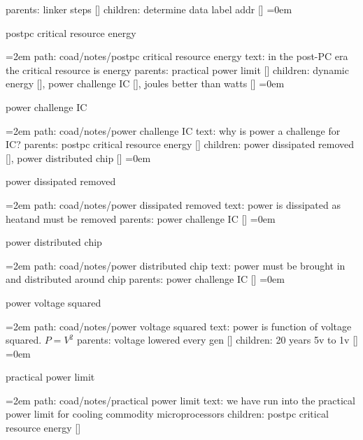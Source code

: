 \smallskip
parents:  linker steps []
\smallskip
children: determine data label addr []
\smallskip
\leftskip=0em
\par\endgroup
\bigskip
{}
postpc critical resource energy
\smallskip
\par\begingroup
\leftskip=2em
path: coad/notes/postpc critical resource energy
\smallskip
text:  in the post-PC era the critical resource is energy
\smallskip
parents:  practical power limit []
\smallskip
children: dynamic energy [], power challenge IC [], joules better than watts []
\smallskip
\leftskip=0em
\par\endgroup
\bigskip
{}
power challenge IC
\smallskip
\par\begingroup
\leftskip=2em
path: coad/notes/power challenge IC
\smallskip
text:  why is power a challenge for IC?
\smallskip
parents:  postpc critical resource energy []
\smallskip
children: power dissipated removed [], power distributed chip []
\smallskip
\leftskip=0em
\par\endgroup
\bigskip
{}
power dissipated removed
\smallskip
\par\begingroup
\leftskip=2em
path: coad/notes/power dissipated removed
\smallskip
text:  power is dissipated as heatand must be removed
\smallskip
parents:  power challenge IC []
\smallskip
\leftskip=0em
\par\endgroup
\bigskip
{}
power distributed chip
\smallskip
\par\begingroup
\leftskip=2em
path: coad/notes/power distributed chip
\smallskip
text:  power must be brought in and distributed around chip
\smallskip
parents:  power challenge IC []
\smallskip
\leftskip=0em
\par\endgroup
\bigskip
{}
power voltage squared
\smallskip
\par\begingroup
\leftskip=2em
path: coad/notes/power voltage squared
\smallskip
text:  power is function of voltage squared. $P=V^2$
\smallskip
parents:  voltage lowered every gen []
\smallskip
children: 20 years 5v to 1v []
\smallskip
\leftskip=0em
\par\endgroup
\bigskip
{}
practical power limit
\smallskip
\par\begingroup
\leftskip=2em
path: coad/notes/practical power limit
\smallskip
text:  we have run into the practical power limit for cooling commodity microprocessors
\smallskip
children: postpc critical resource energy []
